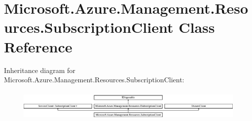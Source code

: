 \hypertarget{class_microsoft_1_1_azure_1_1_management_1_1_resources_1_1_subscription_client}{}\section{Microsoft.\+Azure.\+Management.\+Resources.\+Subscription\+Client Class Reference}
\label{class_microsoft_1_1_azure_1_1_management_1_1_resources_1_1_subscription_client}


 


Inheritance diagram for Microsoft.\+Azure.\+Management.\+Resources.\+Subscription\+Client\+:\begin{figure}[H]
\begin{center}
\leavevmode
\includegraphics[height=1.555556cm]{class_microsoft_1_1_azure_1_1_management_1_1_resources_1_1_subscription_client}
\end{center}
\end{figure}

